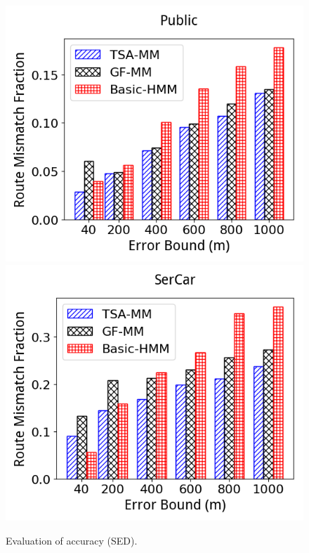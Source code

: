 \begin{figure}[tb!]
	\centering
  \includegraphics[scale=0.3]{Figures/Exp-epsilon-rmf-CISED-RPI-Public.png}
  \includegraphics[scale=0.3]{Figures/Exp-epsilon-rmf-CISED-RPI-SerCar.png}
  \vspace{-2ex}
  \caption{\small Evaluation of accuracy (SED).}
	\label{fig:rmf-epsilon-acc-sed}
 \vspace{-3ex}
\end{figure}

